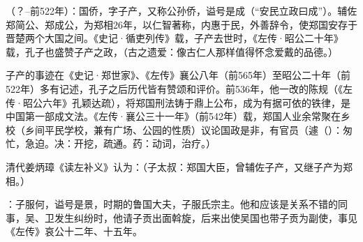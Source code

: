 （？--前522年）：国侨，字子产，又称公孙侨，谥号是成（“安民立政曰成”）。辅佐郑简公、郑成公，为郑相26年，以仁智著称，内惠于民，外善辞令，使郑国安存于晋楚两个大国之间。《史记·循吏列传》载，子产去世时，《左传·昭公二十年》载，孔子也盛赞子产之政，（古之遗爱：像古仁人那样值得怀念爱戴的品德。）

子产的事迹在《史记·郑世家》、《左传》襄公八年（前565年）至昭公二十年（前522年）多有记述，孔子之后历代皆有赞颂和评价。前536年，他一改的陈规（《左传·昭公六年》孔颖达疏），将郑国刑法铸于鼎上公布，成为有据可依的铁律，是中国第一部成文法。《左传·襄公三十一年》（前542年）载，郑国人业余常聚在乡校（乡间平民学校，兼有广场、公园的性质）议论国政是非，有官员（遽（）：匆忙，急迫。决：开挖，疏通。药：动词，治疗。）

清代姜炳璋《读左补义》认为：（子太叔：郑国大臣，曾辅佐子产，又继子产为郑相。）

：子服何，谥号是景，时期的鲁国大夫，子服氏宗主。他和应该是关系不错的同事，吴、卫发生纠纷时，他请子贡出面斡旋，后来出使吴国也带子贡为副使，事见《左传》哀公十二年、十五年。

